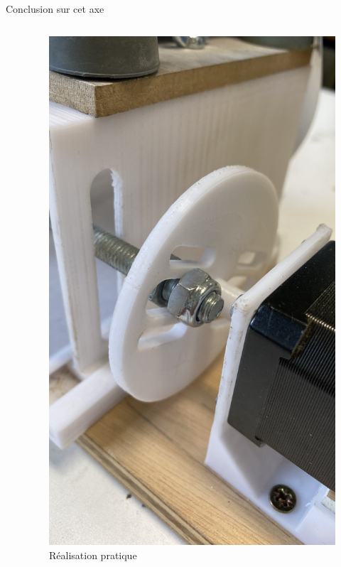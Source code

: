 \documentclass{beamer}
\begin{document}
\begin{frame}{Conclusion sur cet axe}
\begin{columns}
\begin{column}{0.3\textwidth}
		\end{column}
		\begin{column}{0.3\textwidth}
			\begin{figure}
				\includegraphics[width=\textwidth]{Image/Excentrique.jpg}
				\caption{Réalisation pratique}
			\end{figure}
		\end{column}
	\end{columns}
\end{frame}
\end{document}
